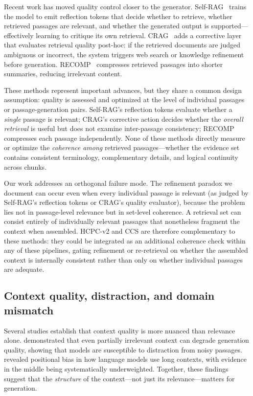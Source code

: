 Recent work has moved quality control closer to the generator.
Self-RAG~\citep{asai2024selfrag} trains the model to emit reflection tokens
that decide whether to retrieve, whether retrieved passages are relevant, and
whether the generated output is supported---effectively learning to critique
its own retrieval. CRAG~\citep{yan2024crag} adds a corrective layer that
evaluates retrieval quality post-hoc: if the retrieved documents are judged
ambiguous or incorrect, the system triggers web search or knowledge
refinement before generation. RECOMP~\citep{xu2023recomp} compresses
retrieved passages into shorter summaries, reducing irrelevant content.

These methods represent important advances, but they share a common design
assumption: quality is assessed and optimized at the level of individual
passages or passage-generation pairs. Self-RAG's reflection tokens evaluate
whether a \emph{single} passage is relevant; CRAG's corrective action
decides whether the \emph{overall retrieval} is useful but does not examine
inter-passage consistency; RECOMP compresses each passage independently. None
of these methods directly measure or optimize the \emph{coherence among}
retrieved passages---whether the evidence set contains consistent
terminology, complementary details, and logical continuity across chunks.

Our work addresses an orthogonal failure mode. The refinement paradox we
document can occur even when every individual passage is relevant (as judged
by Self-RAG's reflection tokens or CRAG's quality evaluator), because the
problem lies not in passage-level relevance but in set-level coherence. A
retrieval set can consist entirely of individually relevant passages that
nonetheless fragment the context when assembled. HCPC-v2 and CCS are
therefore complementary to these methods: they could be integrated as an
additional coherence check within any of these pipelines, gating refinement
or re-retrieval on whether the assembled context is internally consistent
rather than only on whether individual passages are adequate.

\subsection{Context quality, distraction, and domain mismatch}

Several studies establish that context quality is more nuanced than relevance
alone. \citet{shi2023context} demonstrated that even partially irrelevant
context can degrade generation quality, showing that models are susceptible to
distraction from noisy passages. \citet{liu2024lost} revealed positional
bias in how language models use long contexts, with evidence in the middle
being systematically underweighted. Together, these findings suggest that the
\emph{structure} of the context---not just its relevance---matters for
generation.

